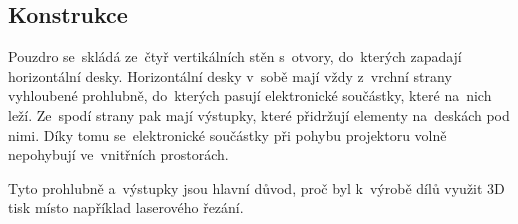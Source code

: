 \subsection{Konstrukce}
Pouzdro se~skládá ze~čtyř vertikálních stěn s~otvory, do~kterých zapadají horizontální desky. Horizontální desky v~sobě mají vždy z~vrchní strany vyhloubené prohlubně, do~kterých pasují elektronické součástky, které na~nich leží. Ze~spodí strany pak mají výstupky, které přidržují elementy na~deskách pod nimi. Díky tomu se~elektronické součástky při pohybu projektoru volně nepohybují ve~vnitřních prostorách.

Tyto prohlubně a~výstupky jsou hlavní důvod, proč byl k~výrobě dílů využit 3D tisk místo například laserového řezání.



